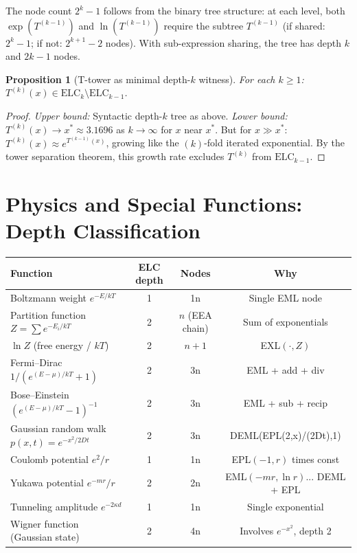 \documentclass[11pt]{article}
\newtheorem{proposition}[theorem]{Proposition}
\begin{document}
\noindent The node count $2^k - 1$ follows from the binary tree structure:
at each level, both $\exp(T^{(k-1)})$ and $\ln(T^{(k-1)})$ require the
subtree $T^{(k-1)}$ (if shared: $2^k - 1$; if not: $2^{k+1} - 2$ nodes).
With sub-expression sharing, the tree has depth $k$ and $2k-1$ nodes.

\begin{proposition}[T-tower as minimal depth-$k$ witness]
For each $k \geq 1$: $T^{(k)}(x) \in \mathrm{ELC}_k \setminus \mathrm{ELC}_{k-1}$.
\end{proposition}

\begin{proof}
\textit{Upper bound:} Syntactic depth-$k$ tree as above.
\textit{Lower bound:} $T^{(k)}(x) \to x^* \approx 3.1696$ as $k \to \infty$
for $x$ near $x^*$. But for $x \gg x^*$: $T^{(k)}(x) \approx e^{T^{(k-1)}(x)}$,
growing like the $(k)$-fold iterated exponential. By the tower separation theorem,
this growth rate excludes $T^{(k)}$ from $\mathrm{ELC}_{k-1}$.
\end{proof}

\section{Physics and Special Functions: Depth Classification}
\label{sec:physics}

\begin{center}
\begin{tabular}{lccc}
\toprule
Function & ELC depth & Nodes & Why \\
\midrule
Boltzmann weight $e^{-E/kT}$ & 1 & 1n & Single EML node \\
Partition function $Z = \sum e^{-E_i/kT}$ & 2 & $n$ (EEA chain) & Sum of exponentials \\
$\ln Z$ (free energy / $kT$) & 2 & $n+1$ & EXL$(\cdot, Z)$ \\
Fermi--Dirac $1/(e^{(E-\mu)/kT}+1)$ & 2 & 3n & EML + add + div \\
Bose--Einstein $(e^{(E-\mu)/kT}-1)^{-1}$ & 2 & 3n & EML + sub + recip \\
Gaussian random walk $p(x,t) = e^{-x^2/2Dt}$ & 2 & 3n & DEML(EPL(2,x)/(2Dt),1) \\
Coulomb potential $e^2/r$ & 1 & 1n & EPL$(-1,r)$ times const \\
Yukawa potential $e^{-mr}/r$ & 2 & 2n & EML$(-mr,\ln r)$... DEML + EPL \\
Tunneling amplitude $e^{-2\kappa d}$ & 1 & 1n & Single exponential \\
Wigner function (Gaussian state) & 2 & 4n & Involves $e^{-x^2}$, depth 2 \\
\bottomrule
\end{tabular}
\end{center}
\end{document}
